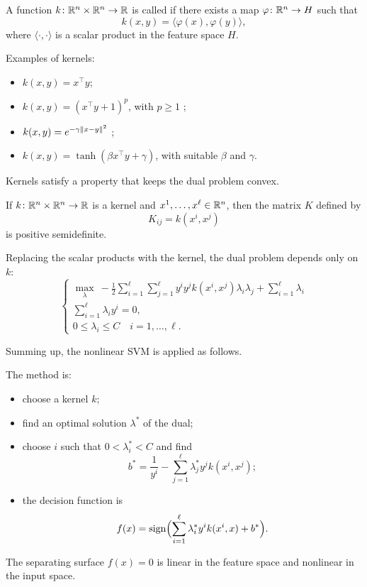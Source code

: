 \newpage
\begin{definition}
    A function $k \colon \mathbb{R}^n \times \mathbb{R}^n \to \mathbb{R}$ is called  if there exists a map $\varphi \colon \mathbb{R}^n \to H$ such that
    \[
        k(x, y) = \langle \varphi(x), \varphi(y) \rangle,
    \]
    where $\langle \cdot, \cdot \rangle$ is a scalar product in the feature space $H$.
\end{definition}

Examples of kernels:
\begin{itemize}
    \item $k(x, y) = x^\top y$;
    \item $k(x, y) = (x^\top y + 1)^p$, with $p \ge 1$ ;
    \item $k(x, y) = e^{-\gamma \left\lVert x - y \right\rVert^2}$ ;
    \item $k(x, y) = \tanh(\beta x^\top y + \gamma)$, with suitable $\beta$ and $\gamma$.
\end{itemize}

Kernels satisfy a property that keeps the dual problem convex.

\begin{theorem}
    If $k \colon \mathbb{R}^n \times \mathbb{R}^n \to \mathbb{R}$ is a kernel and $x^1, \dots, x^\ell \in \mathbb{R}^n$, then the matrix $K$ defined by
    \[
        K_{ij} = k(x^i, x^j)
    \]
    is positive semidefinite.
\end{theorem}

Replacing the scalar products with the kernel, the dual problem depends only on $k$:
\[
    \begin{cases}
        \displaystyle \max_{\lambda} \ -\frac{1}{2} \sum_{i=1}^{\ell} \sum_{j=1}^{\ell} y^i y^j k(x^i, x^j) \lambda_i \lambda_j + \sum_{i=1}^{\ell} \lambda_i \\
        \displaystyle \sum_{i=1}^{\ell} \lambda_i y^i = 0, \\
        0 \le \lambda_i \le C \quad i = 1, \dots, \ell.
    \end{cases}
\]

Summing up, the nonlinear SVM is applied as follows.

The method is:
\begin{itemize}
    \item choose a kernel $k$;
    \item find an optimal solution $\lambda^*$ of the dual;
    \item choose $i$ such that $0 < \lambda^*_i < C$ and find
    \[
        b^* = \frac{1}{y^i} - \sum_{j=1}^{\ell} \lambda^*_j y^j k(x^i, x^j);
    \]
    \item the decision function is
    \[
        f(x) = \operatorname{sign}\Bigl(\sum_{i=1}^{\ell} \lambda^*_i y^i k(x^i, x) + b^*\Bigr).
    \]
\end{itemize}
The separating surface $f(x) = 0$ is linear in the feature space and nonlinear in the input space.
